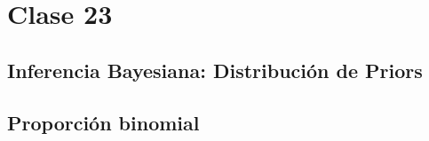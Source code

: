 \chapter{Clase 23}

\section{Inferencia Bayesiana: Distribución de Priors}

\section{Proporción binomial}
